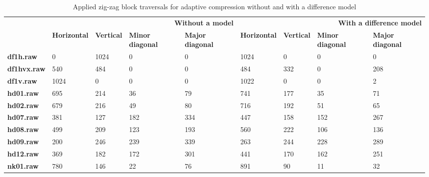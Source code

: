 \begin{table}
\centering
\small
\begin{tabular}{l|llll|llll}
    & \multicolumn{4}{r|}{\textbf{Without a model}} & \multicolumn{4}{r}{\textbf{With a difference model}} \\
    & \textbf{Horizontal} & \textbf{Vertical} & \textbf{Minor diagonal} & \textbf{Major diagonal} & \textbf{Horizontal} & \textbf{Vertical} & \textbf{Minor diagonal} & \textbf{Major diagonal} \\
\hline
    \textbf{df1h.raw} & 0 & 1024 & 0 & 0 & 1024 & 0 & 0 & 0 \\
    \textbf{df1hvx.raw} & 540 & 484 & 0 & 0 & 484 & 332 & 0 & 208 \\
    \textbf{df1v.raw} & 1024 & 0 & 0 & 0 & 1022 & 0 & 0 & 2 \\
    \textbf{hd01.raw} & 695 & 214 & 36 & 79 & 741 & 177 & 35 & 71 \\
    \textbf{hd02.raw} & 679 & 216 & 49 & 80 & 716 & 192 & 51 & 65 \\
    \textbf{hd07.raw} & 381 & 127 & 182 & 334 & 447 & 158 & 152 & 267 \\
    \textbf{hd08.raw} & 499 & 209 & 123 & 193 & 560 & 222 & 106 & 136 \\
    \textbf{hd09.raw} & 200 & 246 & 239 & 339 & 263 & 244 & 228 & 289 \\
    \textbf{hd12.raw} & 369 & 182 & 172 & 301 & 441 & 170 & 162 & 251 \\
    \textbf{nk01.raw} & 780 & 146 & 22 & 76 & 891 & 90 & 11 & 32 \\
\end{tabular}
\caption{Applied zig-zag block traversals for adaptive compression without and with a difference model}
\end{table}